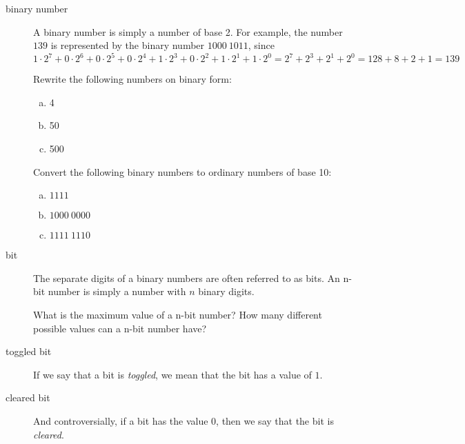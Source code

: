 \begin{description}
\item[binary number] A binary number is simply a number of base 2. For
  example, the number $139$ is represented by the binary number $1000\
  1011$, since $1 \cdot 2^7 + 0 \cdot 2^6 + 0 \cdot 2^5 + 0 \cdot 2^4
  + 1 \cdot 2^3 + 0 \cdot 2^2 + 1 \cdot 2^1 + 1 \cdot 2^0 = 2^7 + 2^3
  + 2^1 + 2^0 = 128 + 8 + 2 + 1 = 139 $

  \begin{Exercise}[label={n-to-bin}]
    Rewrite the following numbers on binary form:

    \begin{enumerate}[(a)]
    \item 4
    \item 50
    \item 500
    \end{enumerate}

  \end{Exercise}

  \begin{Exercise}[label={bin-to-n}]
    Convert the following binary numbers to ordinary numbers of base
    10:

    \begin{enumerate}[(a)]
    \item $1111$
    \item $1000\ 0000$
    \item $1111\ 1110$
    \end{enumerate}

  \end{Exercise}

\item[bit] The separate digits of a binary numbers are often referred
  to as bits. An n-bit number is simply a number with $n$ binary digits.

  \begin{Exercise}[label={n-bits-max-val}]
    What is the maximum value of a n-bit number?  How many different
    possible values can a n-bit number have?
  \end{Exercise}

\item[toggled bit] If we say that a bit is \textit{toggled}, we mean that
  the bit has a value of $1$.

\item[cleared bit] And controversially, if a bit has the value
  $0$, then we say that the bit is \textit{cleared}.


\end{description}
